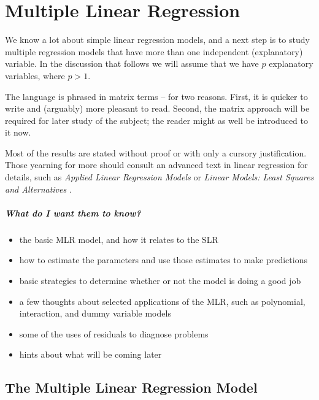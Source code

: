 \documentclass[captions=tableheading]{scrbook}
\begin{document}
\chapter{Multiple Linear Regression}
\label{sec-12}

\label{cha:multiple-linear-regression}


\noindent We know a lot about simple linear regression models, and a next step is to study multiple regression models that have more than one independent (explanatory) variable. In the discussion that follows we will assume that we have \(p\) explanatory variables, where \(p>1\).

The language is phrased in matrix terms -- for two reasons. First, it is quicker to write and (arguably) more pleasant to read. Second, the matrix approach will be required for later study of the subject; the reader might as well be introduced to it now.

Most of the results are stated without proof or with only a cursory justification. Those yearning for more should consult an advanced text in linear regression for details, such as \emph{Applied Linear Regression Models} \cite{Neter1996} or \emph{Linear Models: Least Squares and Alternatives} \cite{Rao1999}.


\paragraph*{What do I want them to know?}

\begin{itemize}
\item the basic MLR model, and how it relates to the SLR
\item how to estimate the parameters and use those estimates to make predictions
\item basic strategies to determine whether or not the model is doing a good job
\item a few thoughts about selected applications of the MLR, such as polynomial, interaction, and dummy variable models
\item some of the uses of residuals to diagnose problems
\item hints about what will be coming later
\end{itemize}
\section{The Multiple Linear Regression Model}
\label{sec-12-1}
\end{document}
